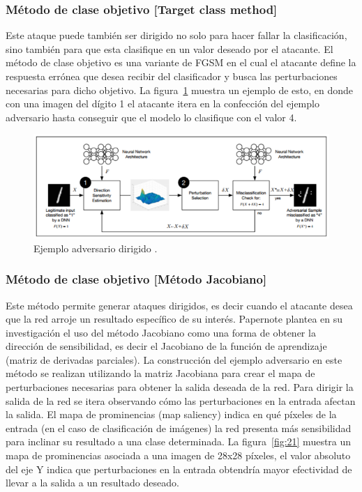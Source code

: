 \subsubsection{Método de clase objetivo [Target class method]}

Este ataque puede también ser dirigido no solo para hacer fallar la clasificación, sino también para que esta clasifique en un valor deseado por el atacante. El método de clase objetivo es una variante de FGSM \parencite{r37} en el cual el atacante define la respuesta errónea que desea recibir del clasificador y busca las perturbaciones necesarias para dicho objetivo. La figura~\ref{fig:20} muestra un ejemplo de esto, en donde con una imagen del dígito 1 el atacante itera en la confección del ejemplo adversario hasta conseguir que el modelo lo clasifique con el valor 4.

\begin{figure}[th]
\centering
\includegraphics [scale = 0.9] {Figures/figura_20.PNG}
\decoRule
\caption[adversario dirigido]{Ejemplo adversario dirigido \parencite{r24}.}
\label{fig:20}
\end{figure}

\subsubsection{Método de clase objetivo [Método Jacobiano]}

Este método permite generar ataques dirigidos, es decir cuando el atacante desea que la red arroje un resultado específico de su interés. Papernote \parencite{r13} plantea en su investigación el uso del método Jacobiano como una forma de obtener la dirección de sensibilidad, es decir el Jacobiano de la función de aprendizaje (matriz de derivadas parciales). La construcción del ejemplo adversario en este método se realizan utilizando la matriz Jacobiana para crear el mapa de perturbaciones necesarias para obtener la salida deseada de la red. Para dirigir la salida de la red se itera observando cómo las perturbaciones en la entrada afectan la salida. El mapa de prominencias (map saliency) indica en qué píxeles de la entrada (en el caso de clasificación de imágenes) la red presenta más sensibilidad para inclinar su resultado a una clase determinada. La figura~\ref{fig:21} muestra un mapa de prominencias asociada a una imagen de 28x28 píxeles, el valor absoluto del eje Y indica que perturbaciones en la entrada obtendría mayor efectividad de llevar a la salida a un resultado deseado.

